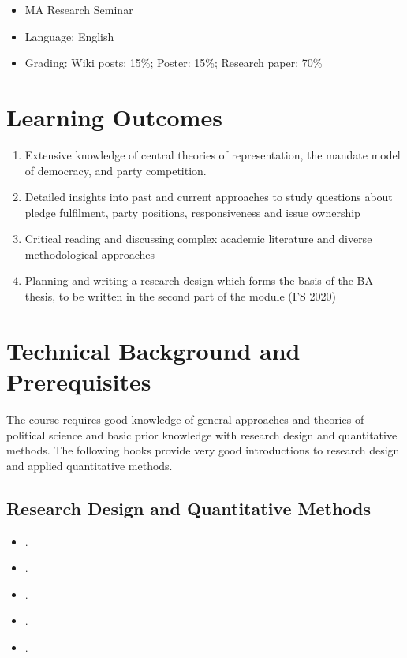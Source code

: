 \documentclass[abstract=on,parskip=full,headings=standardclasses,fontsize=11pt,paper=a4]{scrartcl}
\begin{document}
\begin{itemize}
\item MA Research Seminar
\item  Language: English
\item Grading: Wiki posts: 15\%; Poster: 15\%;  Research paper: 70\%
\end{itemize}

\section*{Learning Outcomes}

\begin{enumerate}
\item Extensive knowledge of central theories of representation, the mandate model of democracy, and party competition. 
\item Detailed insights into past and current approaches to study questions about pledge fulfilment, party positions, responsiveness and issue ownership 
\item Critical reading and discussing  complex academic literature and diverse methodological approaches
\item Planning and writing a research design which forms the basis of the  BA thesis, to be written in the second part of the module (FS 2020)
\end{enumerate}


\section*{Technical Background and Prerequisites}

The course requires good knowledge of general approaches and theories of political science and basic prior knowledge with research design and quantitative methods. The following books provide very good introductions to research design and applied quantitative methods.

\subsection*{Research Design and Quantitative Methods}
\begin{itemize}
\item {}.
\item {}.
\item {}.
\item {}.
\item {}.
\end{itemize}
\end{document}
